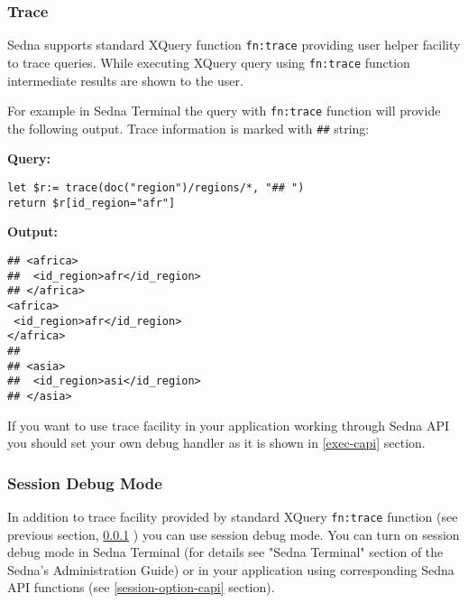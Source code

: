 \documentclass[a4paper,12pt]{article}
\begin{document}
\subsubsection{Trace}
\label{trace}

Sedna supports standard XQuery function \verb!fn:trace! \cite{paper:query-fo}
providing user helper facility to trace queries. While executing XQuery query
using \verb!fn:trace! function intermediate results are shown to the user.

For example in Sedna Terminal the query with \verb!fn:trace! function will
provide the following output. Trace information is marked with \verb!##! string:

\medskip
\noindent
\textbf{Query:}
\begin{verbatim}
let $r:= trace(doc("region")/regions/*, "## ")
return $r[id_region="afr"]
\end{verbatim}

\medskip
\noindent
\textbf{Output:}

\begin{verbatim}
## <africa>
##  <id_region>afr</id_region>
## </africa>
<africa>
 <id_region>afr</id_region>
</africa>
##
## <asia>
##  <id_region>asi</id_region>
## </asia>
\end{verbatim}

If you want to use trace facility in your application working through Sedna API
you should set your own debug handler as it is shown in \ref{exec-capi} section.


\subsubsection{Session Debug Mode}
\label{session-debug-mode}

In addition to trace facility provided by standard XQuery \verb!fn:trace!
function (see previous section, \ref{trace} ) you can use session debug mode.
You can turn on session debug mode in Sedna Terminal (for details see "Sedna
Terminal" section of the Sedna's Administration Guide) or in your application
using corresponding Sedna API functions (see \ref{session-option-capi} section).
\end{document}

